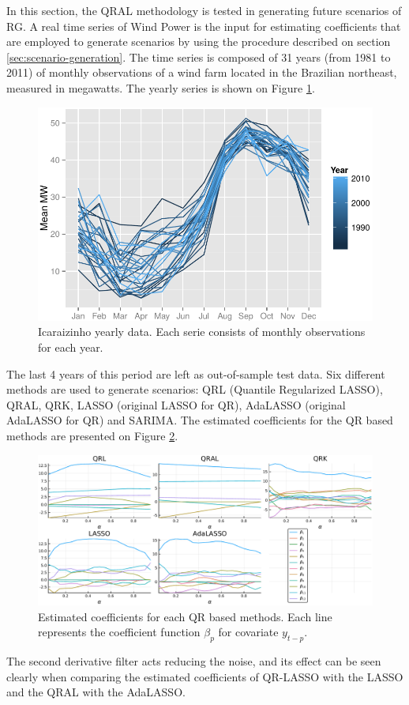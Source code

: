In this section, the QRAL methodology is tested in generating future scenarios of RG. A real time series of Wind Power is the input for estimating coefficients that are employed to generate scenarios by using the procedure described on section \ref{sec:scenario-generation}.
The time series is composed of 31 years (from 1981 to 2011) of monthly observations  of a wind farm located in the Brazilian northeast, measured in megawatts. The yearly series is shown on Figure \ref{fig:icaraizinho-mensal}.
\begin{figure}[h]
\centering
\includegraphics[width=0.8\linewidth]{Images/icaraizinho-mensal2}
\caption{Icaraizinho yearly data. Each serie consists of monthly observations for each year.}
\label{fig:icaraizinho-mensal}
\end{figure}

The last 4 years of this period are left as out-of-sample test data. Six different methods are used to generate scenarios: QRL (Quantile Regularized LASSO), QRAL, QRK, LASSO (original LASSO for QR), AdaLASSO (original AdaLASSO for QR) and SARIMA. The estimated coefficients for the QR based methods are presented on Figure \ref{fig:betas-icaraizinho}. 
\begin{figure}[h]
	\centering
	\includegraphics[width=1.0\linewidth]{Images/betas-icaraizinho}
	\caption{Estimated coefficients for each QR based methods. Each line represents the coefficient function $\beta_{p}$ for covariate $y_{t-p}$.}
	\label{fig:betas-icaraizinho}
\end{figure}
The second derivative filter acts reducing the noise, and its effect can be seen clearly when comparing the estimated coefficients of QR-LASSO with the LASSO and the QRAL with the AdaLASSO. 

